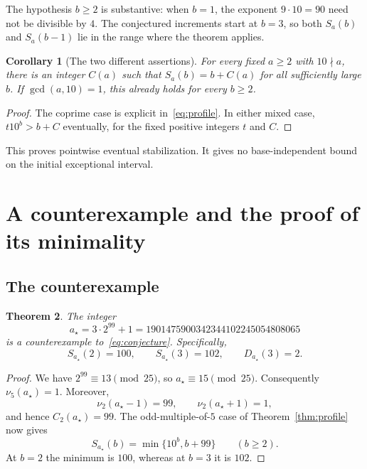 \documentclass[11pt,a4paper]{article}
\newtheorem{theorem}{Theorem}[section]
\newtheorem{corollary}[theorem]{Corollary}
\theoremstyle{definition}
\newcommand{\astar}{a_{\star}}
\begin{document}
The hypothesis $b\ge2$ is substantive: when $b=1$, the exponent
$9\cdot10=90$ need not be divisible by $4$. The conjectured increments
start at $b=3$, so both $S_a(b)$ and $S_a(b-1)$ lie in the range where the
theorem applies.

\begin{corollary}[The two different assertions]\label{cor:fixed}
For every fixed $a\ge2$ with $10\nmid a$, there is an integer $C(a)$ such
that $S_a(b)=b+C(a)$ for all sufficiently large $b$.
If $\gcd(a,10)=1$, this already holds for every $b\ge2$.
\end{corollary}
\begin{proof}
The coprime case is explicit in~\eqref{eq:profile}. In either mixed case,
$t10^b>b+C$ eventually, for the fixed positive integers $t$ and $C$.
\end{proof}
This proves pointwise eventual stabilization. It gives no base-independent
bound on the initial exceptional interval.

\section{A counterexample and the proof of its minimality}\label{sec:counterexample}

\subsection{The counterexample}
\begin{theorem}\label{thm:counterexample}
The integer
\begin{equation}\label{eq:astar}
\astar=3\cdot2^{99}+1=1901475900342344102245054808065
\end{equation}
is a counterexample to~\eqref{eq:conjecture}. Specifically,
\[
S_{\astar}(2)=100,\qquad S_{\astar}(3)=102,\qquad D_{\astar}(3)=2.
\]
\end{theorem}
\begin{proof}
We have $2^{99}\equiv13\pmod{25}$, so $\astar\equiv15\pmod{25}$.
Consequently $\nu_5(\astar)=1$. Moreover,
\[
\nu_2(\astar-1)=99,\qquad \nu_2(\astar+1)=1,
\]
and hence $C_2(\astar)=99$. The odd-multiple-of-$5$ case of
Theorem~\ref{thm:profile} now gives
\begin{equation}\label{eq:astar-profile}
S_{\astar}(b)=\min\{10^b,b+99\}\qquad(b\ge2).
\end{equation}
At $b=2$ the minimum is $100$, whereas at $b=3$ it is $102$.
\end{proof}
\end{document}
